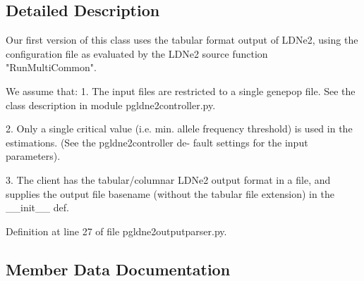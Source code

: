 \subsection{Detailed Description}
\begin{DoxyVerb}Our first version of this class uses the
tabular format output of LDNe2, using the
configuration file as evaluated by the
LDNe2 source function "RunMultiCommon".

We assume that:
    1. The input files are restricted
    to a single genepop file.  See the class
    description in module pgldne2controller.py.

    2. Only a single critical value (i.e. min.
    allele frequency threshold) is used in the
    estimations. (See the pgldne2controller de-
    fault settings for the input parameters).

    3. The client has the tabular/columnar LDNe2 
    output format in a file, and supplies the output file
    basename (without the tabular file extension)
    in the __init__ def.
\end{DoxyVerb}
 

Definition at line 27 of file pgldne2outputparser.\+py.



\subsection{Member Data Documentation}
